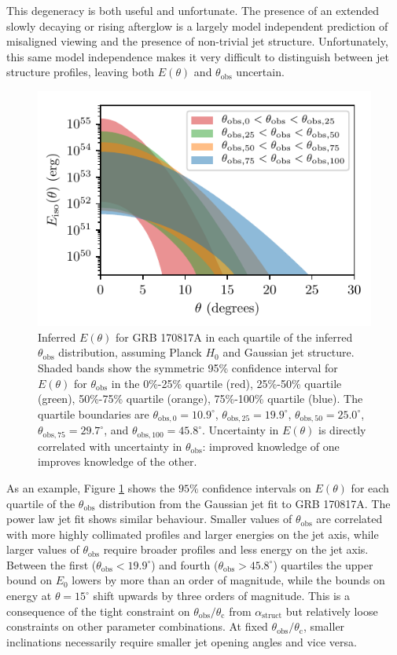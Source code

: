 \documentclass[twocolumn]{aastex62}
\newcommand{\grbbns}{GRB 170817A}
\newcommand{\thobs}{\ensuremath{\theta_{\mathrm{obs}}}}
\newcommand{\thC}{\ensuremath{\theta_{\mathrm{c}}}}
\begin{document}
This degeneracy is both useful and unfortunate.  The presence of an extended slowly decaying or rising afterglow is a largely model independent prediction of misaligned viewing and the presence of non-trivial jet structure.  Unfortunately, this same model independence makes it very difficult to distinguish between jet structure profiles, leaving both $E(\theta)$ and $\thobs$ uncertain.


\begin{figure}
	\includegraphics[width=\columnwidth]{figs/fit_E_theta_model_0.pdf}
	\caption{Inferred $E(\theta)$ for \grbbns{} in each quartile of the inferred $\thobs$ distribution, assuming Planck $H_0$ and Gaussian jet structure. Shaded bands show the symmetric 95\% confidence interval for $E(\theta)$ for $\thobs$ in the 0\%-25\% quartile (red), 25\%-50\% quartile (green), 50\%-75\% quartile (orange), 75\%-100\% quartile (blue).  The quartile boundaries are $\theta_{\mathrm{obs}, 0} = 10.9^\circ$, $\theta_{\mathrm{obs}, 25} = 19.9^\circ$, $\theta_{\mathrm{obs}, 50} = 25.0^\circ$, $\theta_{\mathrm{obs}, 75} = 29.7^\circ$, and $\theta_{\mathrm{obs}, 100} = 45.8^\circ$.  Uncertainty in $E(\theta)$ is directly correlated with uncertainty in $\thobs$: improved knowledge of one improves knowledge of the other.\label{fig:fit_E_theta}}
\end{figure}

As an example, Figure \ref{fig:fit_E_theta} shows the $95\%$ confidence intervals on $E(\theta)$ for each quartile of the $\thobs$ distribution from the Gaussian jet fit to \grbbns{}. The power law jet fit shows similar behaviour. Smaller values of $\thobs$ are correlated with more highly collimated profiles and larger energies on the jet axis, while larger values of $\thobs$ require broader profiles and less energy on the jet axis. Between the first ($\thobs < 19.9^\circ$) and fourth ($\thobs > 45.8^\circ$) quartiles the upper bound on $E_0$ lowers by more than an order of magnitude, while the bounds on energy at $\theta = 15^\circ$ shift upwards by three orders of magnitude.  This is a consequence of the tight constraint on $\thobs/\thC$ from $\alpha_{\mathrm{struct}}$ but relatively loose constraints on other parameter combinations.  At fixed $\thobs/\thC$, smaller inclinations necessarily require smaller jet opening angles and vice versa.  
\end{document}
